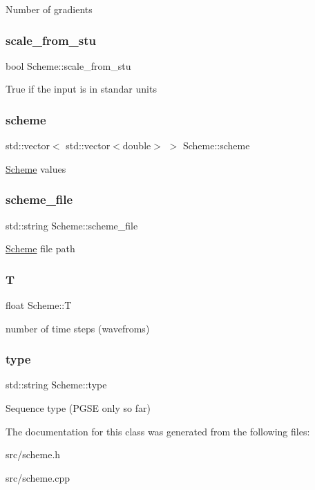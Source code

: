 Number of gradients \mbox{\label{class_scheme_ac66ecb38621208f8dd1b5334919316cf}} 
\subsubsection{\texorpdfstring{scale\+\_\+from\+\_\+stu}{scale\_from\_stu}}
{\footnotesize\ttfamily bool Scheme\+::scale\+\_\+from\+\_\+stu}

True if the input is in standar units \mbox{\label{class_scheme_aa0d26e624075fbac339a746ed10b2dc0}} 
\subsubsection{\texorpdfstring{scheme}{scheme}}
{\footnotesize\ttfamily std\+::vector$<$ std\+::vector$<$double$>$ $>$ Scheme\+::scheme}

\hyperlink{class_scheme}{Scheme} values \mbox{\label{class_scheme_afa0549aa16f4f6c62d6c397909be3350}} 
\subsubsection{\texorpdfstring{scheme\+\_\+file}{scheme\_file}}
{\footnotesize\ttfamily std\+::string Scheme\+::scheme\+\_\+file}

\hyperlink{class_scheme}{Scheme} file path \mbox{\label{class_scheme_a9715a33d087d317724e96229572ebe0d}} 
\subsubsection{\texorpdfstring{T}{T}}
{\footnotesize\ttfamily float Scheme\+::T}

number of time steps (wavefroms) \mbox{\label{class_scheme_a3a767ed00f8859a04857812e370c6db5}} 
\subsubsection{\texorpdfstring{type}{type}}
{\footnotesize\ttfamily std\+::string Scheme\+::type}

Sequence type (P\+G\+SE only so far) 

The documentation for this class was generated from the following files\+:\begin{DoxyCompactItemize}
\item 
src/scheme.\+h\item 
src/scheme.\+cpp\end{DoxyCompactItemize}
